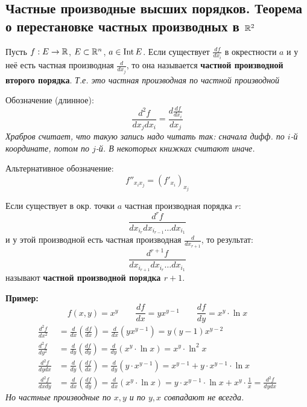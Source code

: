 \subsection{Частные производные высших порядков. Теорема о перестановке частных производных в $\mathbb{R}^2$}

\begin{conj}
    Пусть $f : E \to \mathbb{R}$, $E \subset \mathbb{R}^n$, $a \in \operatorname{Int} E$.
    Если существует $\frac{df}{d x_i}$ в окрестности $a$
    и у неё есть частная производная $\frac{d}{d x_j}$,
    то она называется \textbf{частной производной второго порядка}.
    \textit{Т.е. это частная производная по частной производной}

    Обозначение (длинное):
    $$\frac{d^2 f}{d x_j d x_i} = \frac{d \frac{d f}{d x_i}}{d x_j}$$
    \textit{Храбров считает, что такую запись надо читать так:
    сначала дифф. по $i$-й координате, потом по $j$-й. В некоторых
    книжках считают иначе.}

    Альтернативное обозначение:
    $$f''_{x_i x_j} = (f'_{x_i})_{x_j}$$
\end{conj}

\begin{conj}
    Если существует в окр. точки $a$ частная производная порядка $r$:
    $$ \frac{d^r f}{d x_{i_r} d x_{i_{r-1}} \dots d x_{i_1}} $$
    и у этой производной есть частная производная $\frac{d}{d x_{r+1}}$,
    то результат:
    $$ \frac{d^{r+1} f}{d x_{i_{r+1}} d x_{i_{r}} \dots d x_{i_1}} $$
    называют \textbf{частной производной порядка $r+1$}.
\end{conj}

\textbf{Пример:}
$$f(x, y) = x^y \quad\quad \frac{df}{dx} = y x^{y - 1} 
\quad\quad \frac{df}{dy} = x^y \cdot \ln x$$
\begin{align*}
    \frac{d^2 f}{d x^2} &= \frac{d}{dx} \left( \frac{df}{dx} \right)
    = \frac{d}{dx} \left( y x^{y - 1} \right) = y(y-1) x^{y-2} \\
    \frac{d^2 f}{d y^2} &= \frac{d}{dy} \left( \frac{df}{dy} \right)
    = \frac{d}{dy} \left( x^y \cdot \ln x \right) = x^y \cdot \ln^2 x \\
    \frac{d^2 f}{d y d x} &= \frac{d}{dy} \left( \frac{df}{dx} \right)
    = \frac{d}{dy} \left( y \cdot x^{y - 1} \right) = x^{y-1} + 
    y \cdot x^{y-1} \cdot \ln x \\
    \frac{d^2 f}{d x d y} &= \frac{d}{dx} \left( \frac{df}{dy} \right)
    = \frac{d}{dx} \left( x^y \cdot \ln x \right) =
    y \cdot x^{y - 1} \cdot \ln x + x^y \cdot \frac{1}{x} =
    \frac{d^2 f}{d y d x}
\end{align*}
\textit{Но частные производные по $x,y$ и по $y,x$ совпадают не всегда.}

